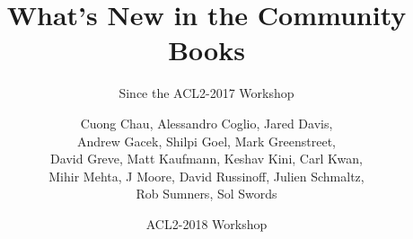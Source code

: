 \documentclass{beamer}
\newcommand{\code}[1]{\texttt{#1}}
\newcommand{\bookpath}[1]{\textbf{\code{#1}}}
\newcommand{\newlibtitle}{\frametitle{New Libraries}}
\newcommand{\implibtitle}{\frametitle{Improved Libraries}}
\begin{document}

\title{What's New in the Community Books}

\subtitle{Since the ACL2-2017 Workshop}

\author{Cuong Chau,
        Alessandro Coglio,
        Jared Davis,
        \\
        Andrew Gacek,
        Shilpi Goel,
        Mark Greenstreet,
        \\
        David Greve,
        Matt Kaufmann,
        Keshav Kini,
        Carl Kwan,
        \\
        Mihir Mehta,
        J Moore,
        David Russinoff,
        Julien Schmaltz,
        \\
        Rob Sumners,
        Sol Swords}


\date{ACL2-2018 Workshop}







\end{document}
